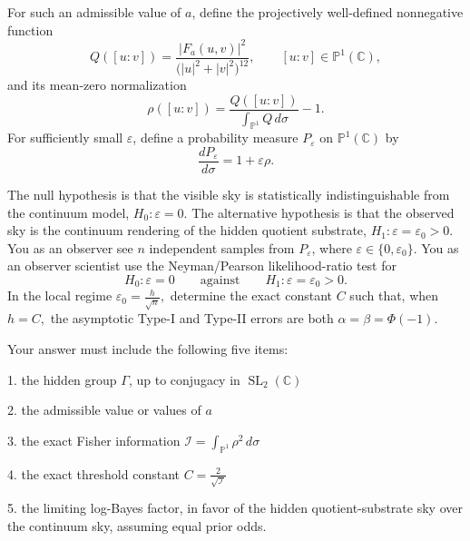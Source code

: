 For such an admissible value of $a$, define the projectively well-defined nonnegative function
\[
Q([u:v])=
\frac{|F_a(u,v)|^2}{\bigl(|u|^2+|v|^2\bigr)^{12}},
\qquad [u:v]\in \mathbb P^1(\mathbb C),
\]
and its mean-zero normalization
\[
\rho([u:v])=
\frac{Q([u:v])}{\displaystyle\int_{\mathbb P^1} Q\,d\sigma}-1.
\]
For sufficiently small \(\varepsilon\), define a probability measure \(P_\varepsilon\) on \(\mathbb P^1(\mathbb C)\) by
\[
\frac{dP_\varepsilon}{d\sigma}=1+\varepsilon\rho.
\]

The null hypothesis is that the visible sky is statistically indistinguishable from the continuum model, $H_0:\varepsilon=0.$ The alternative hypothesis is that the observed sky is the continuum rendering of the hidden quotient substrate, $H_1:\varepsilon=\varepsilon_0>0.$
You as an observer see $n$ independent samples from $P_\varepsilon$, where $\varepsilon\in\{0,\varepsilon_0\}.$ You as an observer scientist use the Neyman/Pearson likelihood-ratio test for
\[
H_0:\varepsilon=0
\qquad\text{against}\qquad
H_1:\varepsilon=\varepsilon_0>0.
\]
In the local regime $\varepsilon_0=\frac{h}{\sqrt n},$ determine the exact constant \(C\) such that, when $h=C,$ the asymptotic Type-I and Type-II errors are both $\alpha=\beta=\Phi(-1).$

Your answer must include the following five items:

1. the hidden group $\Gamma$, up to conjugacy in $\operatorname{SL}_2(\mathbb C)$

2.  the admissible value or values of $a$

3. the exact Fisher information $\mathcal I=\int_{\mathbb P^1}\rho^2\,d\sigma$

4. the exact threshold constant $C=\frac{2}{\sqrt{\mathcal I}}$

5. the limiting log-Bayes factor, in favor of the hidden quotient-substrate sky over the continuum sky, assuming equal prior odds.
